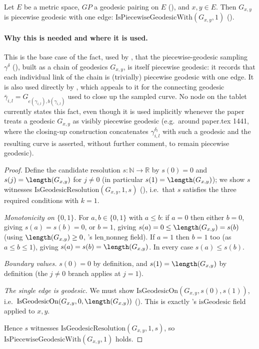 \begin{lemma}
  Let $E$ be a metric space, $GP$ a geodesic pairing on $E$ (), and
  $x,y \in E$. Then $G_{x,y}$ is piecewise geodesic with one edge:
  $\mathrm{IsPiecewiseGeodesicWith}(G_{x,y},1)$ ().

  \paragraph{Why this is needed and where it is used.} This is the base case of the fact, used by
  , that the piecewise-geodesic sampling $\gamma^\delta$
  (), built as a chain of geodesics $G_{x,y}$, is itself piecewise geodesic:
  it records that each individual link of the chain is (trivially) piecewise geodesic with one
  edge. It is also used directly by , which appeals to it for the connecting
  geodesic $\bar\gamma_{i,l} = G_{e(\gamma_{i,l}),b(\gamma_{i,l})}$ used to close up the sampled
  curve. No node on the tablet currently states this fact, even though it is used implicitly
  whenever the paper treats a geodesic $G_{x,y}$ as visibly piecewise geodesic (e.g.\ around
  paper.tex 1441, where the closing-up construction concatenates $\gamma^{\delta_l}_{i,l}$ with
  such a geodesic and the resulting curve is asserted, without further comment, to remain piecewise
  geodesic).
\end{lemma}
\begin{proof}
  Define the candidate resolution $s : \mathbb{N} \to \mathbb{R}$ by $s(0) = 0$ and $s(j) =
  \length(G_{x,y})$ for $j \ne 0$ (in particular $s(1) = \length(G_{x,y})$); we show $s$ witnesses
  $\mathrm{IsGeodesicResolution}(G_{x,y},1,s)$ (), i.e.\ that $s$
  satisfies the three required conditions with $k=1$.

  \emph{Monotonicity on $\{0,1\}$.} For $a,b \in \{0,1\}$ with $a \le b$: if $a=0$ then either
  $b=0$, giving $s(a)=s(b)=0$, or $b=1$, giving $s(a)=0 \le \length(G_{x,y})=s(b)$ (using
  $\length(G_{x,y}) \ge 0$, 's $\mathrm{len\_nonneg}$ field). If $a=1$ then $b=1$
  too (as $a\le b\le 1$), giving $s(a)=s(b)=\length(G_{x,y})$. In every case $s(a)\le s(b)$.

  \emph{Boundary values.} $s(0)=0$ by definition, and $s(1)=\length(G_{x,y})$ by definition
  (the $j\ne0$ branch applies at $j=1$).

  \emph{The single edge is geodesic.} We must show $\mathrm{IsGeodesicOn}(G_{x,y},s(0),s(1))$, i.e.\
  $\mathrm{IsGeodesicOn}(G_{x,y},0,\length(G_{x,y}))$ (). This is exactly
  \noderef{GeodesicPairing}'s $\mathrm{isGeodesic}$ field applied to $x,y$.

  Hence $s$ witnesses $\mathrm{IsGeodesicResolution}(G_{x,y},1,s)$, so
  $\mathrm{IsPiecewiseGeodesicWith}(G_{x,y},1)$ holds.
\end{proof}
